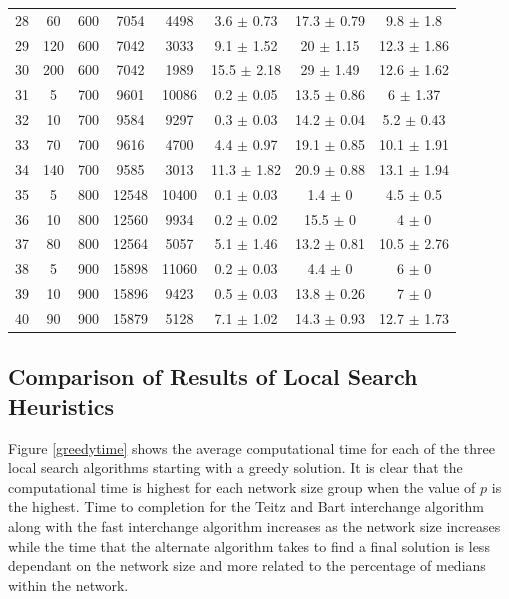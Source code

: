 \documentclass[11pt]{article}
\newcommand{\np}{\newpage}
\begin{document}
\begin{table}[]
{\begin{tabular}{cccccccc}
				28 & 60 & 600 & 7054 & 4498 & 3.6 $\pm$ 0.73 & 17.3 $\pm$ 0.79 & 9.8 $\pm$ 1.8 \\
				29 & 120 & 600 & 7042 & 3033 & 9.1 $\pm$ 1.52 & 20 $\pm$ 1.15 & 12.3 $\pm$ 1.86 \\
				30 & 200 & 600 & 7042 & 1989 & 15.5 $\pm$ 2.18 & 29 $\pm$ 1.49 & 12.6 $\pm$ 1.62 \\
				\rowcolor[HTML]{EFEFEF} 
				31 & 5 & 700 & 9601 & 10086 & 0.2 $\pm$ 0.05 & 13.5 $\pm$ 0.86 & 6 $\pm$ 1.37 \\
				\rowcolor[HTML]{EFEFEF} 
				32 & 10 & 700 & 9584 & 9297 & 0.3 $\pm$ 0.03 & 14.2 $\pm$ 0.04 & 5.2 $\pm$ 0.43 \\
				\rowcolor[HTML]{EFEFEF} 
				33 & 70 & 700 & 9616 & 4700 & 4.4 $\pm$ 0.97 & 19.1 $\pm$ 0.85 & 10.1 $\pm$ 1.91 \\
				\rowcolor[HTML]{EFEFEF} 
				34 & 140 & 700 & 9585 & 3013 & 11.3 $\pm$ 1.82 & 20.9 $\pm$ 0.88 & 13.1 $\pm$ 1.94 \\
				35 & 5 & 800 & 12548 & 10400 & 0.1 $\pm$ 0.03 & 1.4 $\pm$ 0 & 4.5 $\pm$ 0.5 \\
				36 & 10 & 800 & 12560 & 9934 & 0.2 $\pm$ 0.02 & 15.5 $\pm$ 0 & 4 $\pm$ 0 \\
				37 & 80 & 800 & 12564 & 5057 & 5.1 $\pm$ 1.46 & 13.2 $\pm$ 0.81 & 10.5 $\pm$ 2.76 \\
				\rowcolor[HTML]{EFEFEF} 
				38 & 5 & 900 & 15898 & 11060 & 0.2 $\pm$ 0.03 & 4.4 $\pm$ 0 & 6 $\pm$ 0 \\
				\rowcolor[HTML]{EFEFEF} 
				39 & 10 & 900 & 15896 & 9423 & 0.5 $\pm$ 0.03 & 13.8 $\pm$ 0.26 & 7 $\pm$ 0 \\
				\rowcolor[HTML]{EFEFEF} 
				40 & 90 & 900 & 15879 & 5128 & 7.1 $\pm$ 1.02 & 14.3 $\pm$ 0.93 & 12.7 $\pm$ 1.73
			\end{tabular}%
		}
	\end{table} 
	
	\np
	
	\subsection{Comparison of Results of Local Search Heuristics} \label{classicheuristics.localsearch.results}
	
	Figure \ref{greedytime} shows the average computational time for each of the three local search algorithms starting with a greedy solution.  It is clear that the computational time is highest for each network size group when the value of $p$ is the highest.  Time to completion for the Teitz and Bart interchange algorithm  along with the fast interchange algorithm increases as the network size increases while the time that the alternate algorithm takes to find a final solution is less dependant on the network size and more related to the percentage of medians within the network.
	
\end{document}
